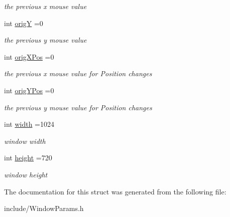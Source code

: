 \begin{DoxyCompactItemize}
\begin{DoxyCompactList}\small\item\em the previous x mouse value \end{DoxyCompactList}\item 
\hypertarget{structWinParams_a9e4ef1b5ef96c1f6bbe46bb10c11d59b}{int \hyperlink{structWinParams_a9e4ef1b5ef96c1f6bbe46bb10c11d59b}{orig\-Y} =0}\label{structWinParams_a9e4ef1b5ef96c1f6bbe46bb10c11d59b}

\begin{DoxyCompactList}\small\item\em the previous y mouse value \end{DoxyCompactList}\item 
\hypertarget{structWinParams_ab07a11274084415333c1fd0a5fc03667}{int \hyperlink{structWinParams_ab07a11274084415333c1fd0a5fc03667}{orig\-X\-Pos} =0}\label{structWinParams_ab07a11274084415333c1fd0a5fc03667}

\begin{DoxyCompactList}\small\item\em the previous x mouse value for Position changes \end{DoxyCompactList}\item 
\hypertarget{structWinParams_a5dc76afc1f5486221ee40eee3cb9a5ac}{int \hyperlink{structWinParams_a5dc76afc1f5486221ee40eee3cb9a5ac}{orig\-Y\-Pos} =0}\label{structWinParams_a5dc76afc1f5486221ee40eee3cb9a5ac}

\begin{DoxyCompactList}\small\item\em the previous y mouse value for Position changes \end{DoxyCompactList}\item 
\hypertarget{structWinParams_abe7daa1f3fc56dc639141bcbee759c02}{int \hyperlink{structWinParams_abe7daa1f3fc56dc639141bcbee759c02}{width} =1024}\label{structWinParams_abe7daa1f3fc56dc639141bcbee759c02}

\begin{DoxyCompactList}\small\item\em window width \end{DoxyCompactList}\item 
\hypertarget{structWinParams_a9b7c0ae0270bc1f7cfad6d95524b886b}{int \hyperlink{structWinParams_a9b7c0ae0270bc1f7cfad6d95524b886b}{height} =720}\label{structWinParams_a9b7c0ae0270bc1f7cfad6d95524b886b}

\begin{DoxyCompactList}\small\item\em window height \end{DoxyCompactList}\end{DoxyCompactItemize}


The documentation for this struct was generated from the following file\-:\begin{DoxyCompactItemize}
\item 
include/Window\-Params.\-h\end{DoxyCompactItemize}
